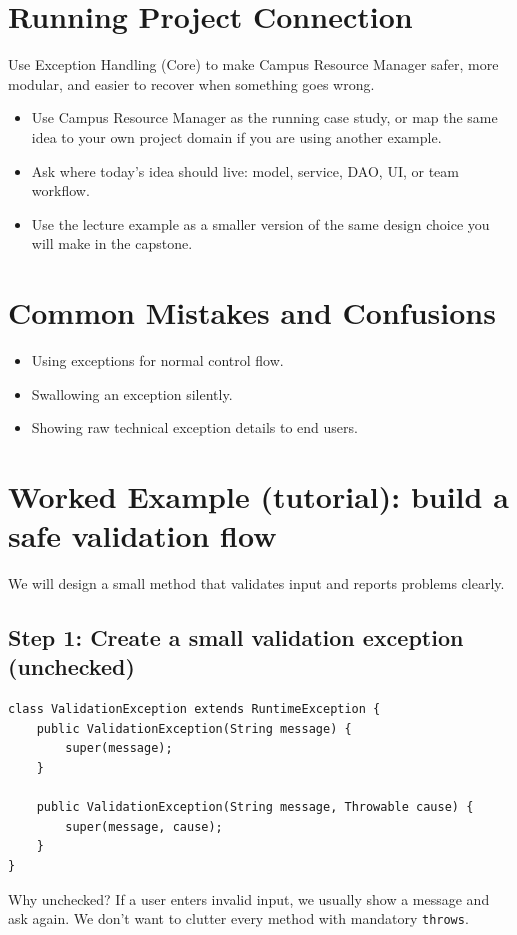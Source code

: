 \documentclass[11pt]{article}
\begin{document}
\section{Running Project Connection}
Use Exception Handling (Core) to make Campus Resource Manager safer, more modular, and easier to recover when something goes wrong.
\begin{itemize}
  \item Use Campus Resource Manager as the running case study, or map the same idea to your own project domain if you are using another example.
  \item Ask where today's idea should live: model, service, DAO, UI, or team workflow.
  \item Use the lecture example as a smaller version of the same design choice you will make in the capstone.
\end{itemize}
\notesources{\OOPSUnitIIISources}

\section{Common Mistakes and Confusions}
\begin{itemize}
  \item Using exceptions for normal control flow.
  \item Swallowing an exception silently.
  \item Showing raw technical exception details to end users.
\end{itemize}
\notesources{\OOPSUnitIIISources}

\section{Worked Example (tutorial): build a safe validation flow}
We will design a small method that validates input and reports problems clearly.

\subsection*{Step 1: Create a small validation exception (unchecked)}
\begin{lstlisting}
class ValidationException extends RuntimeException {
    public ValidationException(String message) {
        super(message);
    }

    public ValidationException(String message, Throwable cause) {
        super(message, cause);
    }
}
\end{lstlisting}
Why unchecked? If a user enters invalid input, we usually show a message and ask again. We don't want to clutter every method with mandatory \texttt{throws}.
\end{document}
